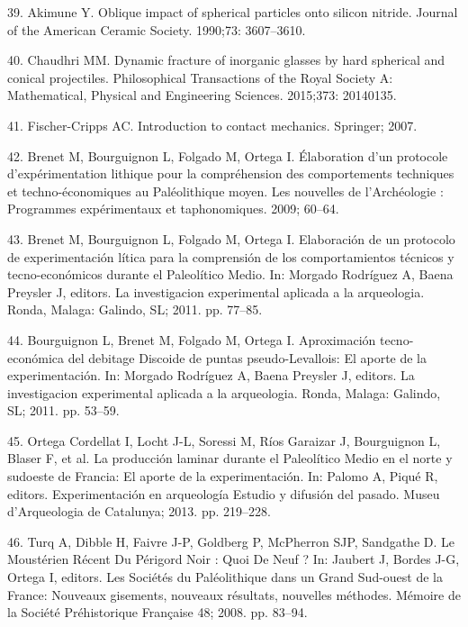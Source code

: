 \documentclass[10pt,letterpaper]{article}
\newenvironment{cslreferences}%
  {}%
  {\par}
\begin{document}
\begin{cslreferences}
\leavevmode\hypertarget{ref-akimune_oblique_1990}{}%
39. Akimune Y. Oblique impact of spherical particles onto silicon
nitride. Journal of the American Ceramic Society. 1990;73: 3607--3610.

\leavevmode\hypertarget{ref-chaudhri_dynamic_2015}{}%
40. Chaudhri MM. Dynamic fracture of inorganic glasses by hard spherical
and conical projectiles. Philosophical Transactions of the Royal Society
A: Mathematical, Physical and Engineering Sciences. 2015;373: 20140135.

\leavevmode\hypertarget{ref-fischer-cripps_introduction_2007}{}%
41. Fischer-Cripps AC. Introduction to contact mechanics. Springer;
2007.

\leavevmode\hypertarget{ref-brenet_elaboration_2009}{}%
42. Brenet M, Bourguignon L, Folgado M, Ortega I. Élaboration d'un
protocole d'expérimentation lithique pour la compréhension des
comportements techniques et techno-économiques au Paléolithique moyen.
Les nouvelles de l'Archéologie : Programmes expérimentaux et
taphonomiques. 2009; 60--64.

\leavevmode\hypertarget{ref-brenet_elaboracion_2011}{}%
43. Brenet M, Bourguignon L, Folgado M, Ortega I. Elaboración de un
protocolo de experimentación lítica para la comprensión de los
comportamientos técnicos y tecno-económicos durante el Paleolítico
Medio. In: Morgado Rodríguez A, Baena Preysler J, editors. La
investigacion experimental aplicada a la arqueologia. Ronda, Malaga:
Galindo, SL; 2011. pp. 77--85.

\leavevmode\hypertarget{ref-bourguignon_aproximacion_2011}{}%
44. Bourguignon L, Brenet M, Folgado M, Ortega I. Aproximación
tecno-económica del debitage Discoide de puntas pseudo-Levallois: El
aporte de la experimentación. In: Morgado Rodríguez A, Baena Preysler J,
editors. La investigacion experimental aplicada a la arqueologia. Ronda,
Malaga: Galindo, SL; 2011. pp. 53--59.

\leavevmode\hypertarget{ref-ortega_cordellat_produccion_2013}{}%
45. Ortega Cordellat I, Locht J-L, Soressi M, Ríos Garaizar J,
Bourguignon L, Blaser F, et al. La producción laminar durante el
Paleolítico Medio en el norte y sudoeste de Francia: El aporte de la
experimentación. In: Palomo A, Piqué R, editors. Experimentación en
arqueología Estudio y difusión del pasado. Museu d'Arqueologia de
Catalunya; 2013. pp. 219--228.

\leavevmode\hypertarget{ref-jaubert_mousterien_2008}{}%
46. Turq A, Dibble H, Faivre J-P, Goldberg P, McPherron SJP, Sandgathe
D. Le Moustérien Récent Du Périgord Noir : Quoi De Neuf ? In: Jaubert J,
Bordes J-G, Ortega I, editors. Les Sociétés du Paléolithique dans un
Grand Sud-ouest de la France: Nouveaux gisements, nouveaux résultats,
nouvelles méthodes. Mémoire de la Société Préhistorique Française 48;
2008. pp. 83--94.


\end{cslreferences}
\end{document}
